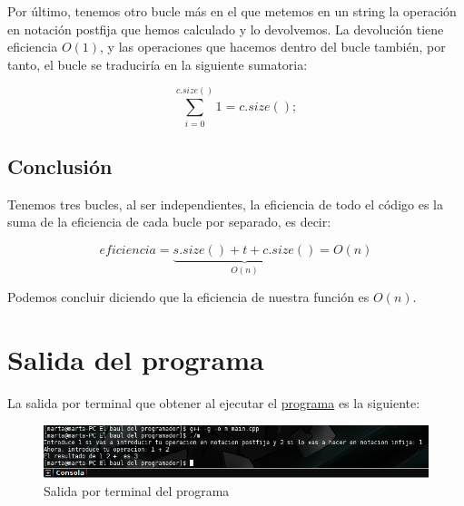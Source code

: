 \documentclass[11pt,a4paper]{article}
\begin{document}
\noindent
Por último,  tenemos otro bucle más en el que metemos en un string la operación en notación postfija que hemos calculado y lo devolvemos. La devolución tiene eficiencia $O(1)$, y las operaciones que hacemos dentro del bucle también, por tanto, el bucle se traduciría en la siguiente sumatoria:

\begin{displaymath}
\sum_{i=0}^{c.size()} 1 = c.size();
\end{displaymath}

\subsection{Conclusión}
Tenemos tres bucles, al ser independientes, la eficiencia de todo el código es la suma de la eficiencia de cada bucle por separado, es decir:

\begin{displaymath}
eficiencia = \underbrace{s.size() + t + c.size()}_{O(n)} = O(n)
\end{displaymath}

\noindent
Podemos concluir diciendo que la eficiencia de nuestra función es $O(n)$.

\newpage
\section{Salida del programa}
\noindent
La salida por terminal que obtener al ejecutar el \hyperref[codigo_programa]{programa} es la siguiente:

\begin{figure}[!h]
\centering
\includegraphics[width=1\textwidth]{1}
\caption{Salida por terminal del programa}
\end{figure}
\end{document}
